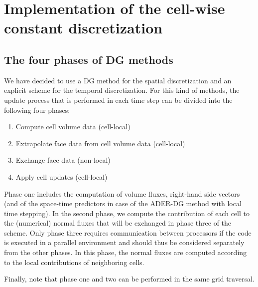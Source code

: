 \documentclass{scrreprt}
\begin{document}
\chapter{Implementation of the cell-wise constant discretization}

\section{The four phases of DG methods}
We have decided to use a DG method for the spatial
discretization and an explicit scheme for the temporal
discretization. For this kind of methods,
the update process that is performed in each time step
can be divided into the following four phases:
\begin{enumerate}
  \item Compute cell volume data (cell-local)
  \item Extrapolate face data from cell volume data (cell-local)
  \item Exchange face data (non-local)
  \item Apply cell updates (cell-local)
\end{enumerate}
Phase one includes the computation of volume fluxes, right-hand side vectors
(and of the space-time predictors in case of the ADER-DG method with local
time stepping).
In the second phase, we compute the contribution of each cell to
the (numerical) normal fluxes that will be exchanged in phase three of the
scheme.
Only phase three requires communication between processors if the
code is executed in a parallel environment and should thus be
considered separately from the other phases.
In this phase, the normal fluxes are computed according to the local
contributions of neighboring cells.

Finally, note that phase one and two can be performed in the same grid
traversal.
\end{document}
